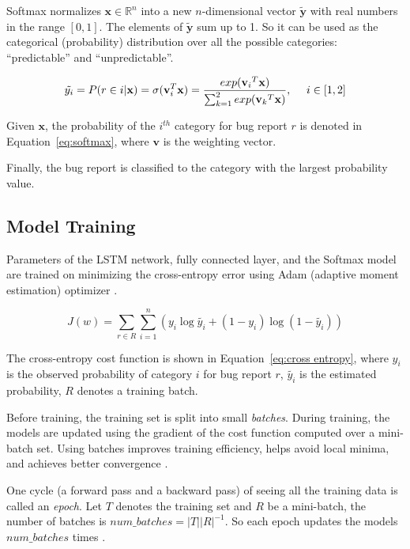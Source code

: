 Softmax normalizes $\mathbf{x} \in \mathbb{R}^{n}$ into a new $n$-dimensional vector $\mathbf{\tilde{y}}$ with real numbers in the range $[0,1]$. The elements of $\mathbf{\tilde{y}}$ sum up to 1. So it can be used as the categorical (probability) distribution over all the possible categories: ``predictable'' and ``unpredictable''.

\begin{equation}
  \tilde{y_i} = P(r \in i|\mathbf{x}) = \sigma(\mathbf{v}_i^T\mathbf{x}) = {exp({\mathbf{v}_i}^T\mathbf{x}) \over \sum_{k=1}^{2}exp({\mathbf{v}_k}^T\mathbf{x})}, \:\:\:\:\:\: i \in [1,2]
\label{eq:softmax}
\end{equation}

Given $\mathbf{x}$, the probability of the $i^{th}$ category for bug report $r$ is denoted in Equation~\ref{eq:softmax}, where $\mathbf{v}$ is the weighting vector.

Finally, the bug report is classified to the category with the largest probability value.

\subsection{Model Training}
\label{sec:model training}
Parameters of the LSTM network, fully connected layer, and the Softmax model are trained on minimizing the cross-entropy error using Adam (adaptive moment estimation) optimizer \cite{DBLP:journals/corr/KingmaB14}.

\begin{equation}
  J(w) = \sum_{r \in R}\sum_{i=1}^{n}(y_i \log \tilde{y_i} + (1-y_i) \log (1-\tilde{y_i}))
\label{eq:cross entropy}
\end{equation}

The cross-entropy cost function is shown in Equation~\ref{eq:cross entropy}, where $y_i$ is the observed probability of category $i$ for bug report $r$, $\tilde{y_i}$ is the estimated probability, $R$ denotes a training batch.

Before training, the training set is split into small \textit{batches}. During training, the models are updated using the gradient of the cost function computed over a mini-batch set. Using batches improves training efficiency, helps avoid local minima, and achieves better convergence \cite{Goodfellow:2016:DL:3086952}.

One cycle (a forward pass and a backward pass) of seeing all the training data is called an \textit{epoch}. Let $T$ denotes the training set and $R$ be a mini-batch, the number of batches is $num\_batches = |T||R|^{-1}$. So each epoch updates the models $num\_batches$ times .

